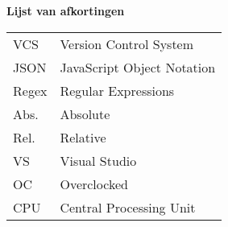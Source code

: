 \Large
\textbf{Lijst van afkortingen}
\newline
\small
\begin{table}[ht]
\small
\begin{tabular}{ll} 
VCS     & Version Control System \\
JSON    & JavaScript Object Notation \\
Regex   & Regular Expressions \\
Abs.    & Absolute \\
Rel.    & Relative \\
VS      & Visual Studio \\
OC      & Overclocked \\
CPU     & Central Processing Unit \\
\end{tabular}
\end{table}

\newpage
